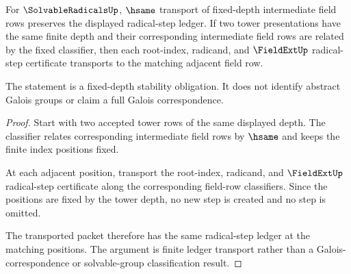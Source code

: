 \begin{theorem}
\label{thm:solvableradicals-intermediate-field-stability}
For $\SolvableRadicalsUp$, $\hsame$ transport of fixed-depth intermediate
field rows preserves the displayed radical-step ledger. If two tower
presentations have the same finite depth and their corresponding intermediate
field rows are related by the fixed classifier, then each root-index,
radicand, and $\FieldExtUp$ radical-step certificate transports to the
matching adjacent field row.

The statement is a fixed-depth stability obligation. It does not identify
abstract Galois groups or claim a full Galois correspondence.
\end{theorem}
\begin{proof}
Start with two accepted tower rows of the same displayed depth. The classifier
relates corresponding intermediate field rows by $\hsame$ and keeps the
finite index positions fixed.

At each adjacent position, transport the root-index, radicand, and
$\FieldExtUp$ radical-step certificate along the corresponding field-row
classifiers. Since the positions are fixed by the tower depth, no new step is
created and no step is omitted.

The transported packet therefore has the same radical-step ledger at the
matching positions. The argument is finite ledger transport rather than a
Galois-correspondence or solvable-group classification result.
\end{proof}


